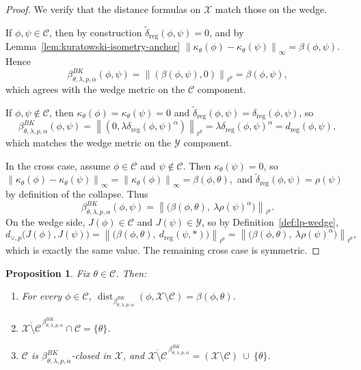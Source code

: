 \documentclass[11pt]{amsart}
\newtheorem{proposition}[theorem]{Proposition}
\theoremstyle{definition}
\theoremstyle{remark}
\newcommand{\1}{\mathbbm{1}}
\newcommand{\norm}[1]{\left\lVert #1\right\rVert}
\begin{document}
\begin{proof}
We verify that the distance formulas on $\mathcal X$ match those on the wedge.

\smallskip\noindent
If $\phi,\psi\in\mathcal C$, then by construction $\widetilde\delta_{\mathrm{reg}}(\phi,\psi)=0$, and by Lemma~\ref{lem:kuratowski-isometry-anchor} $\norm{\kappa_\theta(\phi)-\kappa_\theta(\psi)}_\infty=\beta(\phi,\psi).$
Hence
\[
\beta^{BK}_{\theta,\lambda,p,\alpha}(\phi,\psi)
=\norm{(\beta(\phi,\psi),0)}_{\ell^p}
=\beta(\phi,\psi),
\]
which agrees with the wedge metric on the $\mathcal C$ component.

\smallskip\noindent
If $\phi,\psi\notin\mathcal C$, then $\kappa_\theta(\phi)=\kappa_\theta(\psi)=0$ and
$\widetilde\delta_{\mathrm{reg}}(\phi,\psi)=\delta_{\mathrm{reg}}(\phi,\psi)$, so
\[
\beta^{BK}_{\theta,\lambda,p,\alpha}(\phi,\psi)
=\norm{(0,\lambda\delta_{\mathrm{reg}}(\phi,\psi)^\alpha)}_{\ell^p}
=\lambda\delta_{\mathrm{reg}}(\phi,\psi)^\alpha
=d_{\mathrm{reg}}(\phi,\psi),
\]
which matches the wedge metric on the $\mathcal Y$ component.

\smallskip\noindent
In the cross case, assume $\phi\in\mathcal C$ and $\psi\notin\mathcal C$.
Then $\kappa_\theta(\psi)=0$, so $\norm{\kappa_\theta(\phi)-\kappa_\theta(\psi)}_\infty=\norm{\kappa_\theta(\phi)}_\infty=\beta(\phi,\theta),$
and $\widetilde\delta_{\mathrm{reg}}(\phi,\psi)=\rho(\psi)$ by definition of the collapse.
Thus
\[
\beta^{BK}_{\theta,\lambda,p,\alpha}(\phi,\psi)
=\norm{\bigl(\beta(\phi,\theta),\ \lambda\rho(\psi)^\alpha\bigr)}_{\ell^p}.
\]
On the wedge side, $J(\phi)\in\mathcal C$ and $J(\psi)\in\mathcal Y$, so by Definition~\ref{def:lp-wedge},
\[
d_{\vee,p}\bigl(J(\phi),J(\psi)\bigr)
=\norm{\bigl(\beta(\phi,\theta),\ d_{\mathrm{reg}}(\psi,\ast)\bigr)}_{\ell^p}
=\norm{\bigl(\beta(\phi,\theta),\ \lambda\rho(\psi)^\alpha\bigr)}_{\ell^p},
\]
which is exactly the same value. The remaining cross case is symmetric.
\end{proof}
\begin{proposition}
\label{prop:bk-attachment-closure}
Fix $\theta\in\mathcal C$.
Then:
\begin{enumerate}[label=\textup{(\roman*)}]
\item For every $\phi\in\mathcal C$, $\operatorname{dist}_{\beta^{BK}_{\theta,\lambda,p,\alpha}}(\phi,\mathcal X\setminus\mathcal C)=\beta(\phi,\theta)$.
\item $\overline{\mathcal X\setminus\mathcal C}^{\,\beta^{BK}_{\theta,\lambda,p,\alpha}}\cap \mathcal C=\{\theta\}$.
\item $\mathcal C$ is $\beta^{BK}_{\theta,\lambda,p,\alpha}$-closed in $\mathcal X$, and $\overline{\mathcal X\setminus\mathcal C}^{\,\beta^{BK}_{\theta,\lambda,p,\alpha}}=(\mathcal X\setminus\mathcal C)\ \cup\ \{\theta\}$.
\end{enumerate}
\end{proposition}
\end{document}
